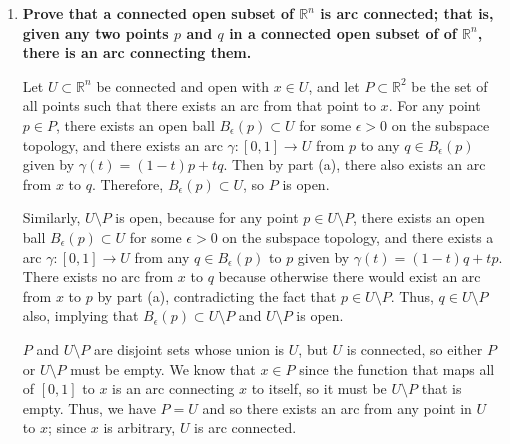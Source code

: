 \documentclass[a4paper,12pt]{article}
\begin{document}
\begin{enumerate}
\begin{enumerate}
            \item
                \boldmath\textbf{Prove that a connected open subset of $\mathbb{R}^n$ is arc connected; that is, given any two points $p$ and $q$ in a connected open subset of of $\mathbb{R}^n$, there is an arc connecting them.
                }\unboldmath \par
                Let $U \subset \mathbb{R}^n$ be connected and open with $x \in U$, and let $P \subset \mathbb{R}^2$ be the set of all points such that there exists an arc from that point to $x$. For any point $p \in P$, there exists an open ball $B_\epsilon(p) \subset U$ for some $\epsilon > 0$ on the subspace topology, and there exists an arc $\gamma : [0, 1] \to U$ from $p$ to any $q \in B_\epsilon(p)$ given by $\gamma(t) = (1 - t)p + tq$. Then by part (a), there also exists an arc from $x$ to $q$. Therefore, $B_\epsilon(p) \subset U$, so $P$ is open. \par
                Similarly, $U \setminus P$ is open, because for any point $p \in U \setminus P$, there exists an open ball $B_\epsilon(p) \subset U$ for some $\epsilon > 0$ on the subspace topology, and there exists a arc $\gamma : [0, 1] \to U$ from any $q \in B_\epsilon(p)$ to $p$ given by $\gamma(t) = (1 - t)q + tp$. There exists no arc from $x$ to $q$ because otherwise there would exist an arc from $x$ to $p$ by part (a), contradicting the fact that $p \in U \setminus P$. Thus, $q \in U \setminus P$ also, implying that $B_\epsilon(p) \subset U \setminus P$ and $U \setminus P$ is open. \par
                $P$ and $U \setminus P$ are disjoint sets whose union is $U$, but $U$ is connected, so either $P$ or $U \setminus P$ must be empty. We know that $x \in P$ since the function that maps all of $[0, 1]$ to $x$ is an arc connecting $x$ to itself, so it must be $U \setminus P$ that is empty. Thus, we have $P = U$ and so there exists an arc from any point in $U$ to $x$; since $x$ is arbitrary, $U$ is arc connected.
        \end{enumerate}
\end{enumerate}
\end{document}
